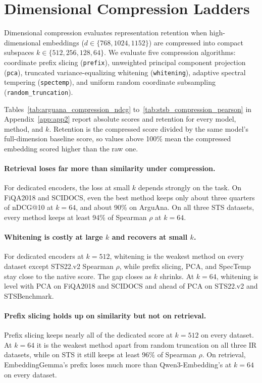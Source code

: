 \section{Dimensional Compression Ladders}
\label{sec:compression_results}

Dimensional compression evaluates representation retention when high-dimensional embeddings ($d \in \{768, 1024, 1152\}$) are compressed into compact subspaces $k \in \{512, 256, 128, 64\}$. We evaluate five compression algorithms: coordinate prefix slicing (\texttt{prefix}), unweighted principal component projection (\texttt{pca}), truncated variance-equalizing whitening (\texttt{whitening}), adaptive spectral tempering (\texttt{spectemp}), and uniform random coordinate subsampling (\texttt{random\_truncation}).

Tables~\ref{tab:arguana_compression_ndcg} to~\ref{tab:stsb_compression_pearson} in Appendix~\ref{app:app2} report absolute scores and retention for every model, method, and $k$. Retention is the compressed score divided by the same model's full-dimension baseline score, so values above 100\% mean the compressed embedding scored higher than the raw one.

\paragraph{Retrieval loses far more than similarity under compression.}
For dedicated encoders, the loss at small $k$ depends strongly on the task. On FiQA2018 and SCIDOCS, even the best method keeps only about three quarters of nDCG@10 at $k=64$, and about 90\% on ArguAna. On all three STS datasets, every method keeps at least 94\% of Spearman $\rho$ at $k=64$.

\paragraph{Whitening is costly at large $k$ and recovers at small $k$.}
For dedicated encoders at $k=512$, whitening is the weakest method on every dataset except STS22.v2 Spearman $\rho$, while prefix slicing, PCA, and SpecTemp stay close to the native score. The gap closes as $k$ shrinks. At $k=64$, whitening is level with PCA on FiQA2018 and SCIDOCS and ahead of PCA on STS22.v2 and STSBenchmark.

\paragraph{Prefix slicing holds up on similarity but not on retrieval.}
Prefix slicing keeps nearly all of the dedicated score at $k=512$ on every dataset. At $k=64$ it is the weakest method apart from random truncation on all three IR datasets, while on STS it still keeps at least 96\% of Spearman $\rho$. On retrieval, EmbeddingGemma's prefix loses much more than Qwen3-Embedding's at $k=64$ on every dataset.

